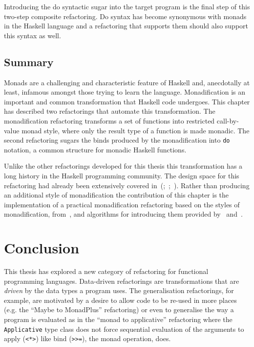 Introducing the do syntactic sugar into the target program is the final step of this two-step composite refactoring. Do syntax has become synonymous with monads in the Haskell language and a refactoring that supports them should also support this syntax as well.

\section{Summary}

Monads are a challenging and characteristic feature of Haskell and, anecdotally at least, infamous amongst those trying to learn the language. Monadification is an important and common transformation that Haskell code undergoes. This chapter has described two refactorings that automate this transformation. The monadification refactoring transforms a set of functions into restricted call-by-value monad style, where only the result type of a function is made monadic. The second refactoring sugars the binds produced by the monadification into \texttt{do} notation, a common structure for monadic Haskell functions.

Unlike the other refactorings developed for this thesis this transformation has a long history in the Haskell programming community. The design space for this refactoring had already been extensively covered in~(\cite{lammelReuse};~\cite{monadification};~\cite{clausMonadResponse}). Rather than producing an additional style of monadification the contribution of this chapter is the implementation of a practical monadification refactoring based on the styles of monadification, from~\cite{clausMonadResponse}, and algorithms for introducing them provided by~\cite{lammelReuse} and~\cite{monadification}.

\chapter{Conclusion}
\label{chp:conc}

This thesis has explored a new category of refactoring for functional programming languages. Data-driven refactorings are transformations that are \textit{driven} by the data types a program uses. The generalisation refactorings, for example, are motivated by a desire to allow code to be re-used in more places (e.g. the ``Maybe to MonadPlus'' refactoring) or even to generalise the way a program is evaluated as in the ``monad to applicative'' refactoring where the \texttt{Applicative} type class does not force sequential evaluation of the arguments to apply (\texttt{<*>}) like bind (\texttt{>>=}), the monad operation, does.


